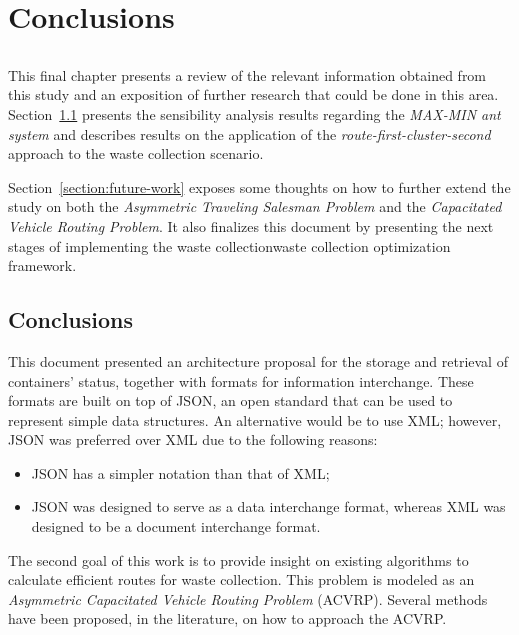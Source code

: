 \chapter{Conclusions}
\label{chap:conclusions}

\section*{}

This final chapter presents a review of the relevant information obtained from
this study and an exposition of further research that could be done in this
area. Section~\ref{section:conclusions} presents the sensibility analysis
results regarding the \textit{MAX-MIN ant system} and describes results on the
application of the \textit{route-first-cluster-second} approach to the waste
collection scenario.

Section~\ref{section:future-work} exposes some thoughts on how to further extend
the study on both the \textit{Asymmetric Traveling Salesman Problem} and the
\textit{Capacitated Vehicle Routing Problem}. It also finalizes this document by
presenting the next stages of implementing the waste collectionwaste collection
optimization framework.


\section{Conclusions}
\label{section:conclusions}

This document presented an architecture proposal for the storage and retrieval
of containers' status, together with formats for information interchange. These
formats are built on top of JSON, an open standard that can be used to represent
simple data structures. An alternative would be to use XML; however, JSON was
preferred over XML due to the following reasons:

\begin{itemize}
  \item JSON has a simpler notation than that of XML;
  \item JSON was designed to serve as a data interchange format, whereas XML
  was designed to be a document interchange format.
\end{itemize}

The second goal of this work is to provide insight on existing algorithms to
calculate efficient routes for waste collection. This problem is modeled as an
\textit{Asymmetric Capacitated Vehicle Routing Problem} (ACVRP). Several methods
have been proposed, in the literature, on how to approach the ACVRP.

